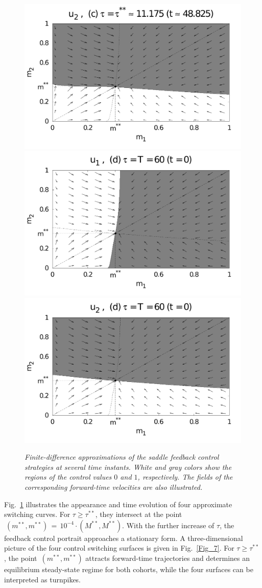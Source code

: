 \documentclass[a4paper,12pt]{article}
\begin{document}
\begin{figure}
{\includegraphics[width = 0.48 \textwidth]{Figure_5c_2.pdf} \\
\includegraphics[width = 0.48 \textwidth]{Figure_5d_1.pdf}
\includegraphics[width = 0.48 \textwidth]{Figure_5d_2.pdf}
}
\bf \caption{\it Finite-difference approximations of the saddle feedback control strategies at several time instants.
White and gray colors show the regions of the control values $ 0 $ and $ 1 ${\rm ,} respectively. The fields of
the corresponding forward-time velocities are also illustrated.}
\label{Fig_5}
\end{figure}

Fig.~\ref{Fig_5} illustrates the appearance and time evolution of four approximate switching curves. For $ \tau \geqslant \tau^{**} $,
they intersect at the point~$ \: \left( m^{**}, m^{**} \right) \, = \, 10^{-4} \cdot \left( M^{**}, M^{**} \right) $. With the further
increase of $ \tau $, the feedback control portrait approaches a stationary form. A three-dimensional picture of the four control
switching surfaces is given in Fig.~\ref{Fig_7}. For $ \tau \geqslant \tau^{**} $, the point~$ \left( m^{**}, m^{**} \right) $ attracts
forward-time trajectories and determines an equilibrium steady-state regime for both cohorts, while the four surfaces can be
interpreted as turnpikes.
\end{document}
